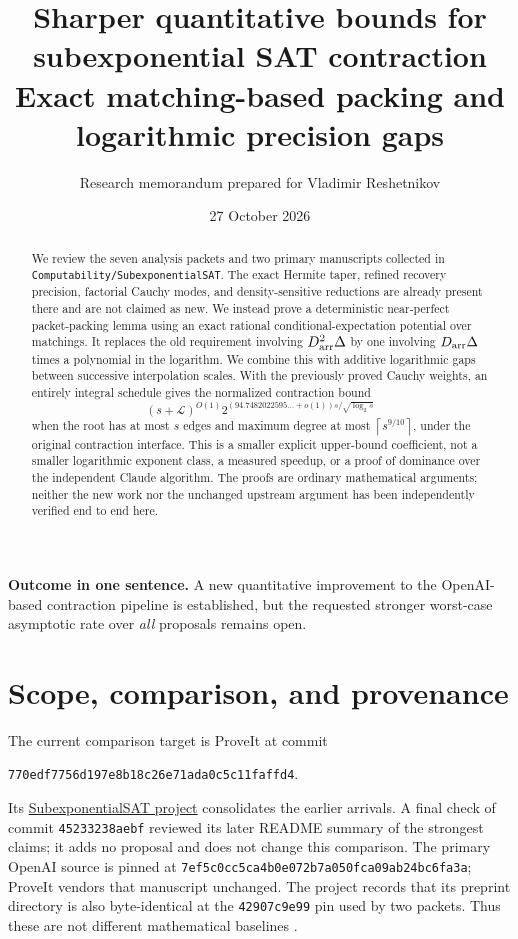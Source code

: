 \documentclass[11pt]{article}
\title{Sharper quantitative bounds for subexponential SAT contraction\\[5pt]\large Exact matching-based packing and logarithmic precision gaps}
\author{Research memorandum prepared for Vladimir Reshetnikov}
\date{27 October 2026}
\theoremstyle{remark}\newtheorem{remark}[theorem]{Remark}
\newcommand{\ceil}[1]{\left\lceil #1\right\rceil}
\newcommand{\LL}{\mathcal L}
\newcommand{\Darr}{D_{\rm arr}}
\newcommand{\Pin}{770edf7756d197e8b18c26e71ada0c5c11faffd4}
\begin{document}
\maketitle
\begin{abstract}
We review the seven analysis packets and two primary manuscripts collected in
\texttt{Computability/SubexponentialSAT}. The exact Hermite taper, refined recovery precision, factorial Cauchy modes, and density-sensitive reductions are already present there and are not claimed as new. We instead prove a deterministic near-perfect packet-packing lemma using an exact rational conditional-expectation potential over matchings. It replaces the old requirement involving \(\Darr^2\Delta\) by one involving \(\Darr\Delta\) times a polynomial in the logarithm. We combine this with additive logarithmic gaps between successive interpolation scales. With the previously proved Cauchy weights, an entirely integral schedule gives the normalized contraction bound
\[
 (s+\LL)^{O(1)}2^{(94.7482022595\ldots+o(1))s/\sqrt{\log_2s}}
\]
when the root has at most \(s\) edges and maximum degree at most \(\ceil{s^{9/10}}\), under the original contraction interface. This is a smaller explicit upper-bound coefficient, not a smaller logarithmic exponent class, a measured speedup, or a proof of dominance over the independent Claude algorithm. The proofs are ordinary mathematical arguments; neither the new work nor the unchanged upstream argument has been independently verified end to end here.
\end{abstract}
\vspace{4pt}
\noindent\textbf{Outcome in one sentence.} A new quantitative improvement to the OpenAI-based contraction pipeline is established, but the requested stronger worst-case asymptotic rate over \emph{all} proposals remains open.
\setcounter{tocdepth}{1}
\tableofcontents
\newpage

\section{Scope, comparison, and provenance}
\label{sec:scope}
The current comparison target is ProveIt at commit
\begin{center}\small\texttt{\Pin}.\end{center}
Its \href{https://github.com/VladimirReshetnikov/ProveIt/tree/770edf7756d197e8b18c26e71ada0c5c11faffd4/Computability/SubexponentialSAT}{SubexponentialSAT project} consolidates the earlier arrivals. A final check of commit \texttt{45233238aebf} reviewed its later README summary of the strongest claims; it adds no proposal and does not change this comparison. The primary OpenAI source is pinned at
\texttt{7ef5c0cc5ca4b0e072b7a050fca09ab24bc6fa3a}; ProveIt vendors that manuscript unchanged. The project records that its preprint directory is also byte-identical at the \texttt{42907c9e99} pin used by two packets. Thus these are not different mathematical baselines \cite{index,source}.
\end{document}
